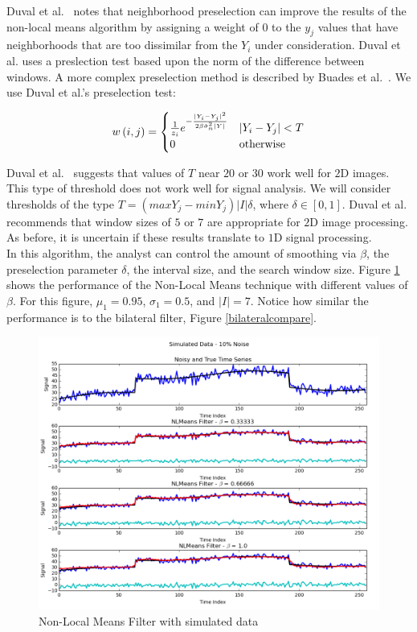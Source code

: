 \documentclass[11pt]{article}
\theoremstyle{definition}
\begin{document}
Duval et al.~\cite{Duval11} notes that neighborhood preselection can improve the results of the non-local means algorithm by assigning a weight of $0$ to the $y_j$ values that have neighborhoods that are too dissimilar from the $Y_i$ under consideration. Duval et al. uses a preslection test based upon the norm of the difference between windows. A more complex preselection method is described by Buades et al.~\cite{Buades05}. We use Duval et al.'s  preselection test:

\begin{displaymath}
w\left(i, j\right) = 
\begin{cases}
\frac{1}{z_i} e^{-\frac{\lvert Y_i - Y_j \rvert ^2}{2 \beta \hat{\sigma}^2_n \lvert Y \rvert}} & \lvert Y_i - Y_j \rvert < T \\
0 & $otherwise$
\end{cases}
\end{displaymath}

Duval et al.~\cite{Duval11} suggests that values of $T$ near $20$ or $30$ work well for $2$D images. This type of threshold does not work well for signal analysis. We will consider thresholds of the type $T = \left( max Y_j - min Y_j \right) \lvert I \rvert \delta$, where $\delta \in \left[ 0, 1 \right]$. Duval et al. recommends that window sizes of $5$ or $7$ are appropriate for $2$D image processing. As before, it is uncertain if these results translate to $1$D signal processing.\\

In this algorithm, the analyst can control the amount of smoothing via $\beta$, the preselection parameter $\delta$, the interval size, and the search window size. Figure \ref{nlmeanscompare} shows the performance of the Non-Local Means technique with different values of $\beta$. For this figure, $\mu_1 = 0.95$, $\sigma_1 = 0.5$, and $\lvert I \rvert = 7$. Notice how similar the performance is to the bilateral filter, Figure \ref{bilateralcompare}.\\

\begin{figure}
\centering
\includegraphics[width = 0.75 \textwidth]{NLMeansCompare.png}
\caption{Non-Local Means Filter with simulated data}
\label{nlmeanscompare}
\end{figure}
\end{document}
